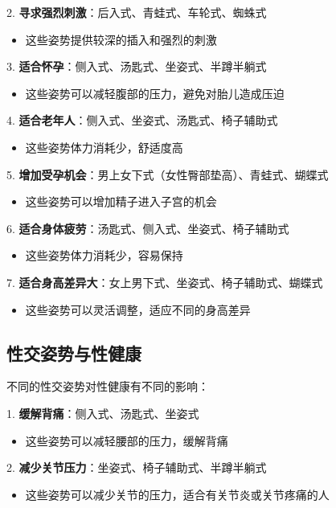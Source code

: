 \documentclass[12pt,UTF8]{ctexbook}
\begin{document}
2. \textbf{寻求强烈刺激}：后入式、青蛙式、车轮式、蜘蛛式
\begin{itemize}
	\item 这些姿势提供较深的插入和强烈的刺激
\end{itemize}

3. \textbf{适合怀孕}：侧入式、汤匙式、坐姿式、半蹲半躺式
\begin{itemize}
	\item 这些姿势可以减轻腹部的压力，避免对胎儿造成压迫
\end{itemize}

4. \textbf{适合老年人}：侧入式、坐姿式、汤匙式、椅子辅助式
\begin{itemize}
	\item 这些姿势体力消耗少，舒适度高
\end{itemize}

5. \textbf{增加受孕机会}：男上女下式（女性臀部垫高）、青蛙式、蝴蝶式
\begin{itemize}
	\item 这些姿势可以增加精子进入子宫的机会
\end{itemize}

6. \textbf{适合身体疲劳}：汤匙式、侧入式、坐姿式、椅子辅助式
\begin{itemize}
	\item 这些姿势体力消耗少，容易保持
\end{itemize}

7. \textbf{适合身高差异大}：女上男下式、坐姿式、椅子辅助式、蝴蝶式
\begin{itemize}
	\item 这些姿势可以灵活调整，适应不同的身高差异
\end{itemize}

\subsection{性交姿势与性健康}

不同的性交姿势对性健康有不同的影响：

1. \textbf{缓解背痛}：侧入式、汤匙式、坐姿式
\begin{itemize}
	\item 这些姿势可以减轻腰部的压力，缓解背痛
\end{itemize}

2. \textbf{减少关节压力}：坐姿式、椅子辅助式、半蹲半躺式
\begin{itemize}
	\item 这些姿势可以减少关节的压力，适合有关节炎或关节疼痛的人
\end{itemize}
\end{document}
